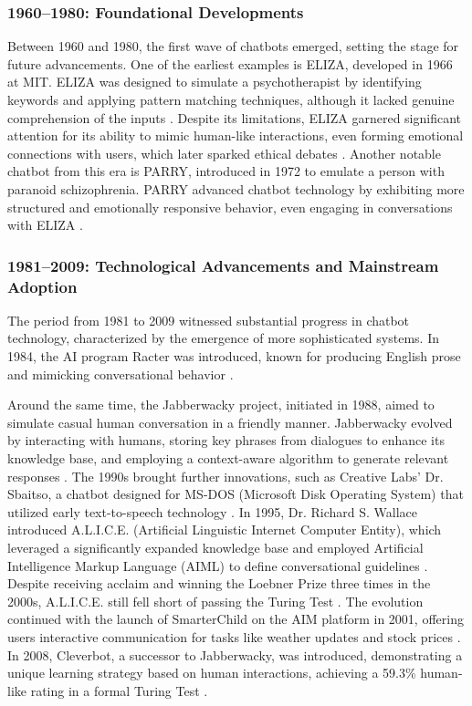 \subsubsection{1960–1980: Foundational Developments}

Between 1960 and 1980, the first wave of chatbots emerged, setting the stage for future advancements. One of the earliest examples is ELIZA, developed in 1966 at MIT. ELIZA was designed to simulate a psychotherapist by identifying keywords and applying pattern matching techniques, although it lacked genuine comprehension of the inputs \cite{weizenbaum1966eliza}. Despite its limitations, ELIZA garnered significant attention for its ability to mimic human-like interactions, even forming emotional connections with users, which later sparked ethical debates \cite{zimmerman2023human}. Another notable chatbot from this era is PARRY, introduced in 1972 to emulate a person with paranoid schizophrenia. PARRY advanced chatbot technology by exhibiting more structured and emotionally responsive behavior, even engaging in conversations with ELIZA \cite{colby1971artificial}.

\subsubsection{1981–2009: Technological Advancements and Mainstream Adoption}

The period from 1981 to 2009 witnessed substantial progress in chatbot technology, characterized by the emergence of more sophisticated systems. In 1984, the AI program Racter was introduced, known for producing English prose and mimicking conversational behavior \cite{wikipedia2023racter}. 

Around the same time, the Jabberwacky project, initiated in 1988, aimed to simulate casual human conversation in a friendly manner. Jabberwacky evolved by interacting with humans, storing key phrases from dialogues to enhance its knowledge base, and employing a context-aware algorithm to generate relevant responses \cite{shawar2007fostering}. The 1990s brought further innovations, such as Creative Labs' Dr. Sbaitso, a chatbot designed for MS-DOS (Microsoft Disk Operating System) that utilized early text-to-speech technology \cite{deryugina2010chatterbots}. In 1995, Dr. Richard S. Wallace introduced A.L.I.C.E. (Artificial Linguistic Internet Computer Entity), which leveraged a significantly expanded knowledge base and employed Artificial Intelligence Markup Language (AIML) to define conversational guidelines \cite{wallace2009anatomy}. Despite receiving acclaim and winning the Loebner Prize three times in the 2000s, A.L.I.C.E. still fell short of passing the Turing Test \cite{shum2018eliza}. The evolution continued with the launch of SmarterChild on the AIM platform in 2001, offering users interactive communication for tasks like weather updates and stock prices \cite{adamopoulou2020chatbots}. In 2008, Cleverbot, a successor to Jabberwacky, was introduced, demonstrating a unique learning strategy based on human interactions, achieving a 59.3\% human-like rating in a formal Turing Test \cite{wikipedia2023cleverbot}.

